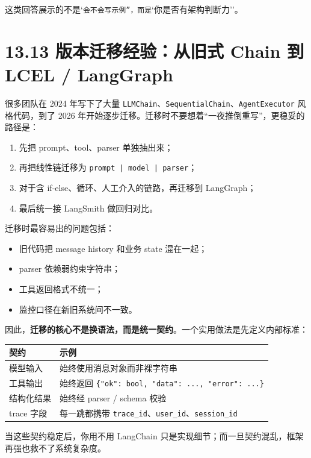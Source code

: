 这类回答展示的不是`\texttt{会不会写示例''，而是}`你是否有架构判断力''。


\section{13.13 版本迁移经验：从旧式 Chain 到 LCEL / LangGraph}

很多团队在 2024 年写下了大量 \texttt{LLMChain}、\texttt{SequentialChain}、\texttt{AgentExecutor} 风格代码，到了 2026 年开始逐步迁移。迁移时不要想着``一夜推倒重写''，更稳妥的路径是：


\begin{enumerate}[leftmargin=2em]
\item 先把 prompt、tool、parser 单独抽出来；
\item 再把线性链迁移为 \texttt{prompt | model | parser}；
\item 对于含 if-else、循环、人工介入的链路，再迁移到 LangGraph；
\item 最后统一接 LangSmith 做回归对比。
\end{enumerate}

迁移时最容易出的问题包括：


\begin{itemize}[leftmargin=2em]
\item 旧代码把 message history 和业务 state 混在一起；
\item parser 依赖弱约束字符串；
\item 工具返回格式不统一；
\item 监控口径在新旧系统间不一致。
\end{itemize}

因此，\textbf{迁移的核心不是换语法，而是统一契约}。一个实用做法是先定义内部标准：


\begingroup
\scriptsize
\setlength{\tabcolsep}{3pt}
\begin{longtable}{|p{}|p{}|}
\hline
契约 & 示例 \\ \hline
模型输入 & 始终使用消息对象而非裸字符串 \\ \hline
工具输出 & 始终返回 \texttt{\{"ok": bool, "data": ..., "error": ...\}} \\ \hline
结构化结果 & 始终经 parser / schema 校验 \\ \hline
trace 字段 & 每一跳都携带 \texttt{trace\_id}、\texttt{user\_id}、\texttt{session\_id} \\ \hline
\end{longtable}
\endgroup

当这些契约稳定后，你用不用 LangChain 只是实现细节；而一旦契约混乱，框架再强也救不了系统复杂度。


